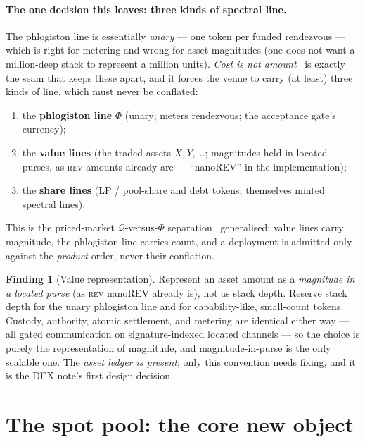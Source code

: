 \documentclass[11pt]{article}
\theoremstyle{definition}
\newtheorem{finding}{Finding}
\newcommand{\rev}{\textsc{rev}}
\newcommand{\phlo}{\ensuremath{\Phi}}
\newcommand{\price}{\ensuremath{\mathcal{Q}}}
\begin{document}
\paragraph{The one decision this leaves: three kinds of spectral line.}
The phlogiston line is essentially \emph{unary} --- one token per funded rendezvous --- which is
right for metering and wrong for asset magnitudes (one does not want a million-deep stack to
represent a million units). \emph{Cost is not amount}~\cite[\S3.6]{finrho} is exactly the seam that
keeps these apart, and it forces the venue to carry (at least) three kinds of line, which must never
be conflated:
\begin{enumerate}[label=(\arabic*),leftmargin=2em]
\item the \textbf{phlogiston line} \phlo{} (unary; meters rendezvous; the acceptance gate's currency);
\item the \textbf{value lines} (the traded assets $X, Y, \dots$; magnitudes held in located purses,
as \rev{} amounts already are --- ``nanoREV'' in the implementation);
\item the \textbf{share lines} (LP / pool-share and debt tokens; themselves minted spectral lines).
\end{enumerate}
This is the priced-market $\price$-versus-\phlo{} separation~\cite[\S6]{ppf} generalised: value lines
carry magnitude, the phlogiston line carries count, and a deployment is admitted only against the
\emph{product} order, never their conflation.

\begin{finding}[Value representation]\label{find:value}
Represent an asset amount as a \emph{magnitude in a located purse} (as \rev{} nanoREV already is),
not as stack depth. Reserve stack depth for the unary phlogiston line and for capability-like,
small-count tokens. Custody, authority, atomic settlement, and metering are identical either way ---
all gated communication on signature-indexed located channels --- so the choice is purely the
representation of magnitude, and magnitude-in-purse is the only scalable one. The \emph{asset ledger
is present}; only this convention needs fixing, and it is the DEX note's first design decision.
\end{finding}

\section{The spot pool: the core new object}\label{sec:pool}
\end{document}
